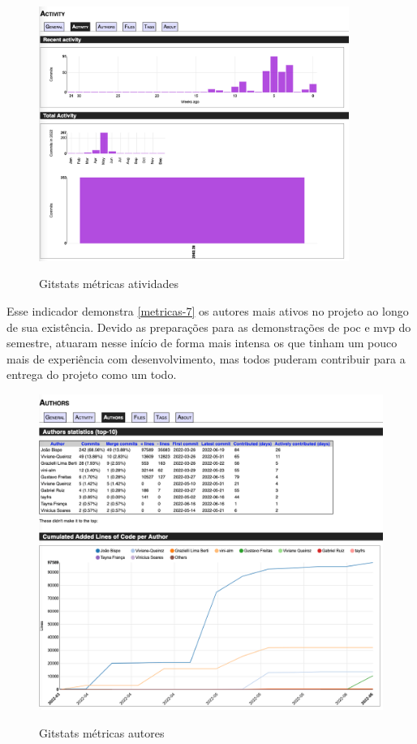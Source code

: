 \begin{figure}[htb]
	\centering
	\caption{\label{fig_arq_virado}Gitstats métricas atividades}
	\includegraphics[width=0.90\textwidth]{anexos/metricas6.png}
	\label{metricas-6}
\end{figure}

Esse indicador demonstra \autoref{metricas-7} os autores mais ativos no projeto ao longo de sua existência. Devido as preparações para as demonstrações de \ac{poc} e \ac{mvp} do semestre, atuaram nesse início de forma mais intensa os que tinham um pouco mais de experiência com desenvolvimento, mas todos puderam contribuir para a entrega do projeto como um todo. 

\begin{figure}[htb]
	\centering
	\caption{\label{fig_arq_virado}Gitstats métricas autores}
	\includegraphics[width=1.00\textwidth]{anexos/metricas7.png}
	\label{metricas-7}
\end{figure}

